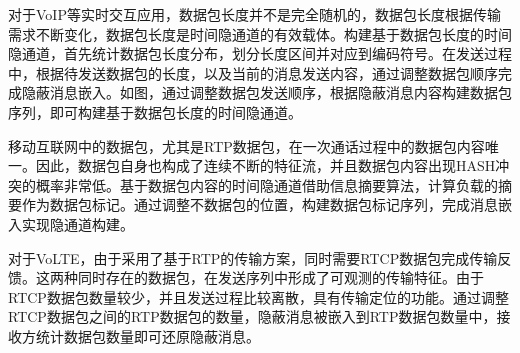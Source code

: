 
对于VoIP等实时交互应用，数据包长度并不是完全随机的，数据包长度根据传输需求不断变化，数据包长度是时间隐通道的有效载体。构建基于数据包长度的时间隐通道，首先统计数据包长度分布，划分长度区间并对应到编码符号。在发送过程中，根据待发送数据包的长度，以及当前的消息发送内容，通过调整数据包顺序完成隐蔽消息嵌入。如图，通过调整数据包发送顺序，根据隐蔽消息内容构建数据包序列，即可构建基于数据包长度的时间隐通道。

移动互联网中的数据包，尤其是RTP数据包，在一次通话过程中的数据包内容唯一。因此，数据包自身也构成了连续不断的特征流，并且数据包内容出现HASH冲突的概率非常低。基于数据包内容的时间隐通道借助信息摘要算法，计算负载的摘要作为数据包标记。通过调整不数据包的位置，构建数据包标记序列，完成消息嵌入实现隐通道构建。

对于VoLTE，由于采用了基于RTP的传输方案，同时需要RTCP数据包完成传输反馈。这两种同时存在的数据包，在发送序列中形成了可观测的传输特征。由于RTCP数据包数量较少，并且发送过程比较离散，具有传输定位的功能。通过调整RTCP数据包之间的RTP数据包的数量，隐蔽消息被嵌入到RTP数据包数量中，接收方统计数据包数量即可还原隐蔽消息。


